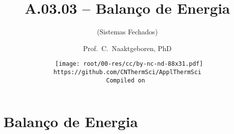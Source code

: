 \makeatletter
\immediate{} %
\makeatother


\title{A.03.03 -- Balanço de Energia}
\subtitle{(Sistemas Fechados)}
\author{Prof.~C.~Naaktgeboren, PhD}
\date{{\scriptsize\tt%
    \texttt{[image: root/00-res/cc/by-nc-nd-88x31.pdf]}\\[\smallskipamount]
    https://github.com/CNThermSci/ApplThermSci\\
    Compiled on 
}}

\logo{%
    \parbox{158mm}{%
        \texttt{[image: root/00-res/UTFPR/UTFPR-logo-A.pdf]}\hfill%
        \texttt{[image: root/00-res/logo/CNThermSci-logo-A.pdf]}%
}} %
\frame{\titlepage}

\frame{\tableofcontents}

\section{Balanço de Energia}

